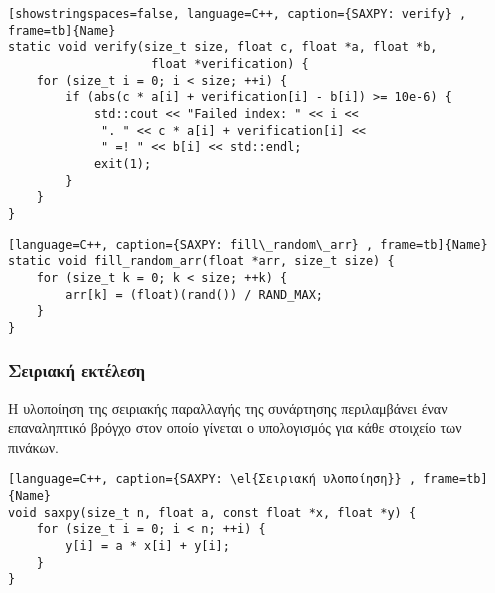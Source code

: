 \begin{spacing}{1}
\begin{lstlisting}[showstringspaces=false, language=C++, caption={SAXPY: verify} , frame=tb]{Name}
static void verify(size_t size, float c, float *a, float *b, 
                    float *verification) {
    for (size_t i = 0; i < size; ++i) {
        if (abs(c * a[i] + verification[i] - b[i]) >= 10e-6) {
            std::cout << "Failed index: " << i <<
             ". " << c * a[i] + verification[i] << 
             " =! " << b[i] << std::endl;
            exit(1);
        }
    }
}
\end{lstlisting}
\end{spacing}

\begin{spacing}{1}
\begin{lstlisting}[language=C++, caption={SAXPY: fill\_random\_arr} , frame=tb]{Name}
static void fill_random_arr(float *arr, size_t size) {
    for (size_t k = 0; k < size; ++k) {
        arr[k] = (float)(rand()) / RAND_MAX;
    }
}       
\end{lstlisting}
\end{spacing}

\clearpage
\subsubsection{Σειριακή εκτέλεση}
Η υλοποίηση της σειριακής παραλλαγής της συνάρτησης  περιλαμβάνει έναν επαναληπτικό 
βρόγχο στον οποίο γίνεται ο υπολογισμός για κάθε στοιχείο των πινάκων.
\begin{spacing}{0.8}
\begin{lstlisting}[language=C++, caption={SAXPY: \el{Σειριακή υλοποίηση}} , frame=tb]{Name}
void saxpy(size_t n, float a, const float *x, float *y) {
    for (size_t i = 0; i < n; ++i) {
        y[i] = a * x[i] + y[i];
    }
}   
\end{lstlisting}
\end{spacing}

